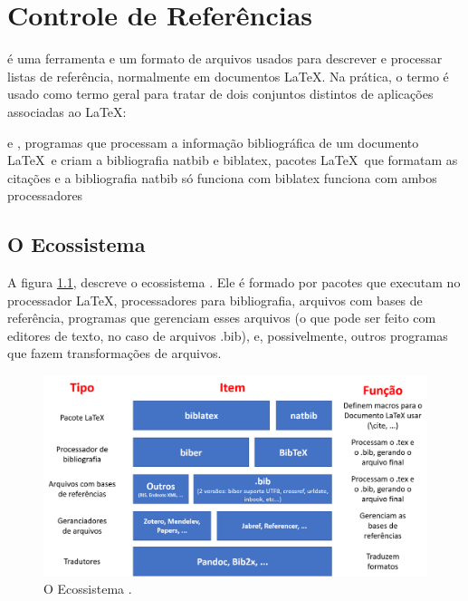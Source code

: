 \chapter{Controle de Referências}

 é uma ferramenta e um formato de arquivos usados para descrever e processar listas de referência,       normalmente em documentos \LaTeX  . Na prática, o termo  é usado como termo geral para tratar de dois conjuntos distintos de aplicações associadas ao \LaTeX:
\begin{outline}
    \1  e , programas que
    processam a informação bibliográfica de um documento \LaTeX\ e criam a bibliografia
    \1 natbib e biblatex, pacotes \LaTeX\ que formatam as citações e a bibliografia
    \2 natbib só funciona com 
    \2 biblatex funciona com ambos processadores
\end{outline}


\section{O Ecossistema }


A figura \ref{fig:mundolatexport}\autocite{bibera2012}, descreve o ecossistema . Ele é formado por pacotes que executam no processador \LaTeX , processadores para bibliografia, arquivos com bases de referência, programas que gerenciam esses arquivos (o que pode ser feito com editores de texto, no caso de arquivos .bib), e, possivelmente, outros programas que fazem transformações de arquivos.

\begin{figure}[hbt]
    \centering
    \includegraphics[width=0.9\linewidth]{Images/mundolatexport}
    \caption{O Ecossistema \parencite{bibera2012}.}
    \label{fig:mundolatexport}
\end{figure}



